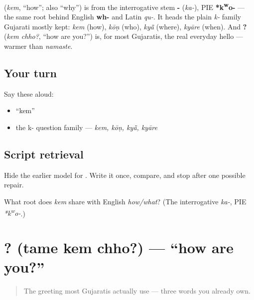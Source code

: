 \begin{cousinweb}
\textbf{} (\emph{kem}, \textquotedblleft{}how\textquotedblright{}; also \textquotedblleft{}why\textquotedblright{}) is from the interrogative stem \textbf{-} (\emph{ka-}), PIE \textbf{*k\textsuperscript{w}o-} — the same root behind English \textbf{wh-} and Latin \emph{qu-}. It heads the plain \emph{k-} family Gujarati mostly kept: \emph{kem} (how), \emph{kōṇ} (who), \emph{kyā̃} (where), \emph{kyāre} (when). And \textbf{ ?} (\emph{kem chho?}, \textquotedblleft{}how are you?\textquotedblright{}) is, for most Gujaratis, the real everyday hello — warmer than \emph{namaste}.
\end{cousinweb}

\subsection*{Your turn}
Say these aloud:

\begin{itemize}
\raggedright
  \item \textquotedblleft{}kem\textquotedblright{}
  \item the k- question family — \emph{kem, kōṇ, kyā̃, kyāre}
\end{itemize}

\subsection*{Script retrieval}
Hide the earlier model for \textbf{}. Write it once, compare, and stop after one possible repair.

\begin{tcolorbox}[breakable,colback=teal!4,colframe=teal!35!black,title={Before you move on}]
What root does \emph{kem} share with English \emph{how/what}? (The interrogative \emph{ka-}, PIE \emph{*k\textsuperscript{w}o-}.)
\end{tcolorbox}
\section[\texorpdfstring{\gu{તમે} \gu{કેમ} \gu{છો}? (tame kem chho?)}{તમે કેમ છો? (tame kem chho?)}]{  ? (tame kem chho?) — \textquotedblleft{}how are you?\textquotedblright{}}

\label{lesson:GU-C03-tame-kem-chho}



\begin{quote}
The greeting most Gujaratis actually use — three words you already own.
\end{quote}

